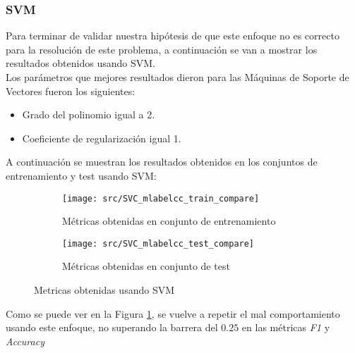 \subsubsection*{SVM}
Para terminar de validar nuestra hipótesis de que este enfoque no es correcto para la resolución de este problema, a continuación se van a mostrar los resultados obtenidos usando SVM.\\
\linebreak
Los parámetros que mejores resultados dieron para las Máquinas de Soporte de Vectores fueron los siguientes:
\begin{itemize}
	\item Grado del polinomio igual a 2.
	\item Coeficiente de regularización igual 1.
\end{itemize}
A continuación se muestran los resultados obtenidos en los conjuntos de entrenamiento y test usando SVM:
\begin{figure}[H]
	\centering
	\begin{subfigure}[b]{0.5\textwidth}
		\centering
		\texttt{[image: src/SVC\_mlabelcc\_train\_compare]}
		\caption{Métricas obtenidas en conjunto de entrenamiento}
	\end{subfigure}
	\vfill
	\begin{subfigure}[b]{0.5\textwidth}
		\centering
		\texttt{[image: src/SVC\_mlabelcc\_test\_compare]}
		\caption{Métricas obtenidas en conjunto de test}
	\end{subfigure}
	\vfill
\caption{Metricas obtenidas usando SVM}
\label{fig:svcml_cmp}
\end{figure}
Como se puede ver en la Figura \ref{fig:svcml_cmp}, se vuelve a repetir el mal comportamiento usando este enfoque, no superando la barrera del $0.25$  en las métricas \textit{F1} y \textit{Accuracy}
\clearpage

